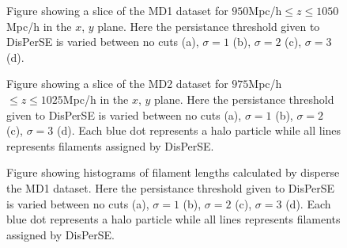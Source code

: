 \begin{figure}[H]
    \hspace{1em}%
    \hspace{1em}%
    \caption{Figure showing a slice of the MD1 dataset for $950$Mpc/h$\leq z\leq1050$Mpc/h in the $x$, $y$ plane. Here the persistance threshold given to DisPerSE is varied between no cuts (a), $\sigma=1$ (b), $\sigma=2$ (c), $\sigma=3$ (d).}
    \label{fig:scatterMD1}
\end{figure}
\begin{figure}[H]
    \hspace{2em}%
    \hspace{2em}%
    \caption{Figure showing a slice of the MD2 dataset for $975$Mpc/h $\leq z\leq1025$Mpc/h in the $x$, $y$ plane. Here the persistance threshold given to DisPerSE is varied between no cuts (a), $\sigma=1$ (b), $\sigma=2$ (c), $\sigma=3$ (d). Each blue dot represents a halo particle while all lines represents filaments assigned by DisPerSE.}
    \label{fig:scatterMD2}
\end{figure}

\begin{figure}[H]
    \hspace{1em}%
    \hspace{1em}%
    \caption{Figure showing histograms of filament lengths calculated by disperse the MD1 dataset. Here the persistance threshold given to DisPerSE is varied between no cuts (a), $\sigma=1$ (b), $\sigma=2$ (c), $\sigma=3$ (d). Each blue dot represents a halo particle while all lines represents filaments assigned by DisPerSE.}
    \label{fig:histMD1}
\end{figure}

